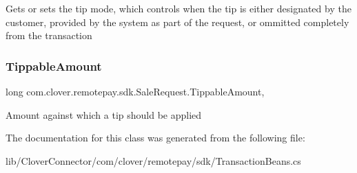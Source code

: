 Gets or sets the tip mode, which controls when the tip is either designated by the customer, provided by the system as part of the request, or ommitted completely from the transaction 

\mbox{\label{classcom_1_1clover_1_1remotepay_1_1sdk_1_1_sale_request_aad74927135a360b3b391c96160195dac}} 
\subsubsection{\texorpdfstring{Tippable\+Amount}{TippableAmount}}
{\footnotesize\ttfamily long com.\+clover.\+remotepay.\+sdk.\+Sale\+Request.\+Tippable\+Amount\hspace{0.3cm}{\ttfamily [get]}, {\ttfamily [set]}}



Amount against which a tip should be applied 



The documentation for this class was generated from the following file\+:\begin{DoxyCompactItemize}
\item 
lib/\+Clover\+Connector/com/clover/remotepay/sdk/Transaction\+Beans.\+cs\end{DoxyCompactItemize}
